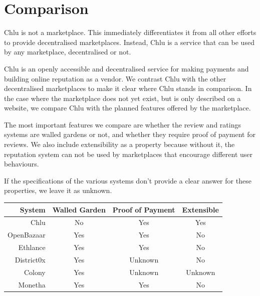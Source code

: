 \documentclass[a4paper]{article}
\begin{document}
\section{Comparison}

Chlu is not a marketplace. This immediately differentiates it from all
other efforts to provide decentralised marketplaces. Instead, Chlu is
a service that can be used by any marketplace, decentralised or not.

Chlu is an openly accessible and decentralised service for making
payments and building online reputation as a vendor. We contrast Chlu
with the other decentralised marketplaces to make it clear where Chlu
stands in comparison. In the case where the marketplace does not yet
exist, but is only described on a website, we compare Chlu with the
planned features offered by the marketplace.

The most important features we compare are whether the review and
ratings systems are walled gardens or not, and whether they require
proof of payment for reviews. We also include extensibility as a
property because without it, the reputation system can not be used by
marketplaces that encourage different user behaviours.

If the specifications of the various systems don't provide a clear
answer for these properties, we leave it as unknown.

\begin{center}
\begin{tabular}{ | r | c | c | c | }
  \hline
  System & Walled Garden & Proof of Payment & Extensible \\
  \hline

  Chlu & No & Yes & Yes \\

  \hline

  OpenBazaar\cite{openbazaar} & Yes & Yes & No \\

  \hline

  Ethlance\cite{ethlance} & Yes & Yes & No \\

  \hline

  District0x\cite{district0x} & Yes & Unknown & No \\

  \hline

  Colony\cite{colony} & Yes & Unknown & Unknown \\

  \hline

  Monetha\cite{monetha} & Yes & Yes & No \\

  \hline
\end{tabular}
\end{center}
\end{document}
